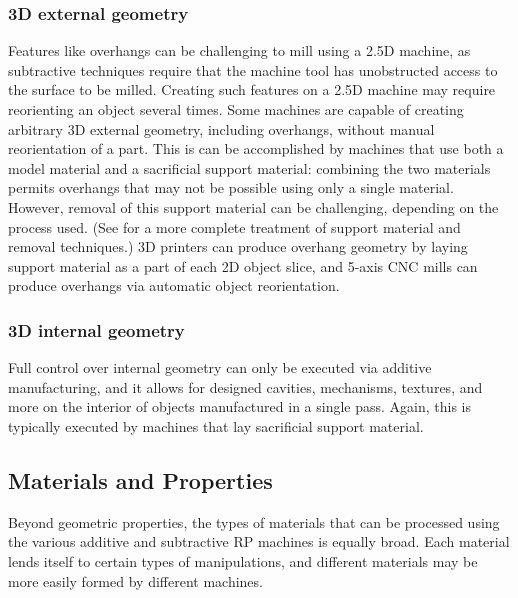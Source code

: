 \subsubsection{3D external geometry}

Features like overhangs can be challenging to mill using a 2.5D machine, as subtractive techniques require that the machine tool has unobstructed access to the surface to be milled. Creating such features on a 2.5D machine may require reorienting an object several times. Some machines are capable of creating arbitrary 3D external geometry, including overhangs, without manual reorientation of a part. This is can be accomplished by machines that use both a model material and a sacrificial support material: combining the two materials permits overhangs that may not be possible using only a single material. However, removal of this support material can be challenging, depending on the process used. (See \cite{savage-sot} for a more complete treatment of support material and removal techniques.) 3D printers can produce overhang geometry by laying support material as a part of each 2D object slice, and 5-axis CNC mills can produce overhangs via automatic object reorientation.

\subsubsection{3D internal geometry}

Full control over internal geometry can only be executed via additive manufacturing, and it allows for designed cavities, mechanisms, textures, and more on the interior of objects manufactured in a single pass. Again, this is typically executed by machines that lay sacrificial support material.

\subsection{Materials and Properties}

Beyond geometric properties, the types of materials that can be processed using the various additive and subtractive RP machines is equally broad. Each material lends itself to certain types of manipulations, and different materials may be more easily formed by different machines.


